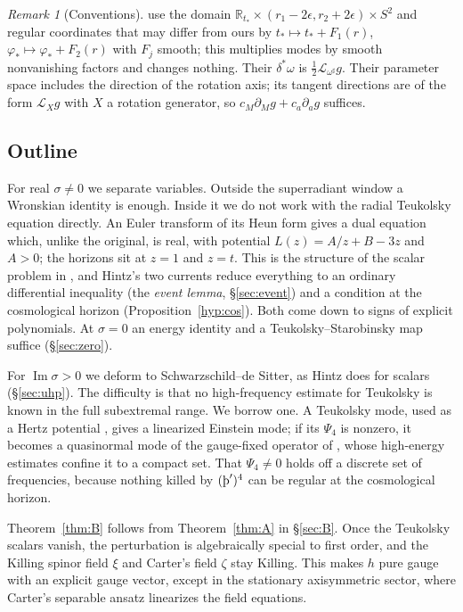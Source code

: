 \documentclass[11pt]{amsart}
\theoremstyle{definition}
\theoremstyle{remark}
\newtheorem{remark}[theorem]{Remark}
\numberwithin{equation}{section}
\newcommand{\Th}{\text{\th}}
\newcommand{\cL}{\mathcal{L}}
\newcommand{\R}{\mathbb{R}}
\renewcommand{\Im}{\operatorname{Im}}
\begin{document}
\begin{remark}[Conventions]\label{rem:T}
\cite{HPV25} use the domain $\R_{t_*}\times(r_1-2\epsilon,r_2+2\epsilon)\times S^2$ and regular coordinates that may differ
from ours by $t_*\mapsto t_*+F_1(r)$, $\varphi_*\mapsto\varphi_*+F_2(r)$ with $F_j$ smooth; this multiplies modes by smooth
nonvanishing factors and changes nothing. Their $\delta^*\omega$ is $\frac12\cL_{\omega^\sharp}g$. Their parameter space
includes the direction of the rotation axis; its tangent directions are of the form $\cL_Xg$ with $X$ a rotation
generator, so $c_M\partial_Mg+c_a\partial_ag$ suffices.
\end{remark}

\subsection{Outline}
For real $\sigma\ne0$ we separate variables. Outside the superradiant window a Wronskian identity is enough. Inside it
we do not work with the radial Teukolsky equation directly. An Euler transform of its Heun form gives a dual equation
which, unlike the original, is real, with potential $L(z)=A/z+B-3z$ and $A>0$; the horizons sit at $z=1$ and $z=t$.
This is the structure of the scalar problem in \cite{Hin26}, and Hintz's two currents reduce everything to an
ordinary differential inequality (the \emph{event lemma}, \S\ref{sec:event}) and a condition at the cosmological
horizon (Proposition~\ref{hyp:cos}). Both come down to signs of explicit polynomials. At $\sigma=0$ an energy
identity and a Teukolsky--Starobinsky map suffice (\S\ref{sec:zero}).

For $\Im\sigma>0$ we deform to Schwarzschild--de Sitter, as Hintz does for scalars (\S\ref{sec:uhp}). The difficulty
is that no high-frequency estimate for Teukolsky is known in the full subextremal range. We borrow one. A Teukolsky
mode, used as a Hertz potential \cite{Wal78}, gives a linearized Einstein mode; if its $\Psi_4$ is nonzero, it becomes a
quasinormal mode of the gauge-fixed operator of \cite{HPV25}, whose high-energy estimates confine it to a compact set.
That $\Psi_4\ne0$ holds off a discrete set of frequencies, because nothing killed by $(\Th')^4$ can be regular at the
cosmological horizon.

Theorem~\ref{thm:B} follows from Theorem~\ref{thm:A} in \S\ref{sec:B}. Once the Teukolsky scalars vanish, the
perturbation is algebraically special to first order, and the Killing spinor field $\xi$ and Carter's field $\zeta$
stay Killing. This makes $h$ pure gauge with an explicit gauge vector, except in the stationary axisymmetric sector,
where Carter's separable ansatz linearizes the field equations.
\end{document}
